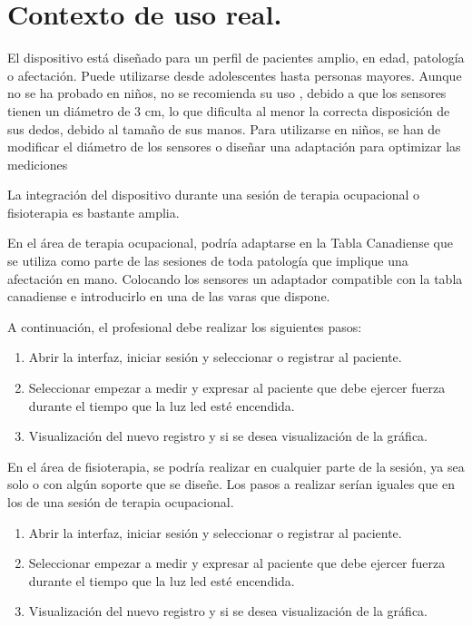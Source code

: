 \section{Contexto de uso real.}
El dispositivo está diseñado para un perfil de pacientes amplio, en edad, patología o afectación. Puede utilizarse desde adolescentes hasta personas mayores. Aunque no se ha probado en niños, no se recomienda su uso , debido a que los sensores tienen un diámetro de 3 cm, lo que dificulta al menor la correcta disposición de sus dedos, debido al tamaño de sus manos. Para utilizarse en niños, se han de modificar el diámetro de los sensores o diseñar una adaptación para optimizar las mediciones

La integración del dispositivo durante una sesión de terapia ocupacional o fisioterapia es bastante amplia.

En el área de terapia ocupacional, podría adaptarse en la Tabla Canadiense que se utiliza como parte de las sesiones de toda patología que implique una afectación en mano. Colocando los sensores un adaptador compatible con la tabla canadiense e introducirlo en una de las varas que dispone. 

A continuación, el profesional debe realizar los siguientes pasos: 
\begin{enumerate}
    \item Abrir la interfaz, iniciar sesión y seleccionar o registrar al paciente.
    \item Seleccionar empezar a medir y expresar al paciente que debe ejercer fuerza durante el tiempo que la luz led esté encendida.
    \item Visualización del nuevo registro y si se desea visualización de la gráfica. 
\end{enumerate}

En el área de fisioterapia, se podría realizar en cualquier parte de la sesión, ya sea solo o con algún soporte que se diseñe. Los pasos a realizar serían iguales que en los de una sesión de terapia ocupacional. 
\begin{enumerate}
    \item Abrir la interfaz, iniciar sesión y seleccionar o registrar al paciente.
    \item Seleccionar empezar a medir y expresar al paciente que debe ejercer fuerza durante el tiempo que la luz led esté encendida.
    \item Visualización del nuevo registro y si se desea visualización de la gráfica. 
\end{enumerate}

